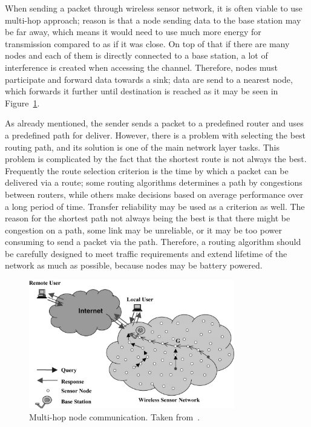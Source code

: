 When sending a packet through wireless sensor network, it is often viable to use multi-hop approach; reason is that a node sending data to the base station may be far away, which means it would need to use much more energy for transmission compared to as if it was close. On top of that if there are many nodes and each of them is directly connected to a base station, a lot of interference is created when accessing the channel. Therefore, nodes must participate and forward data towards a sink; data are send to a nearest node, which forwards it further until destination is reached as it may be seen in Figure~\ref{fig:multihop}.

As already mentioned, the sender sends a packet to a predefined router and uses a predefined path for deliver. However, there is a problem with selecting the best routing path, and its solution is one of the main network layer tasks. This problem is complicated by the fact that the shortest route is not always the best. Frequently the route selection criterion is the time by which a packet can be delivered via a route; some routing algorithms determines a path by congestions between routers, while others make decisions based on average performance over a long period of time. Transfer reliability may be used as a criterion as well. The reason for the shortest path not always being the best is that there might be congestion on a path, some link may be unreliable, or it may be too power consuming to send a packet via the path. Therefore, a routing algorithm should be carefully designed to meet traffic requirements and extend lifetime of the network as much as possible, because nodes may be battery powered.

\begin{figure}
    \centering
    \includegraphics[width=0.8\textwidth]{00images/multihop}
    \caption{Multi-hop node communication. Taken from~\cite{Sohraby2007WirelessApplications}.}
    \label{fig:multihop}
\end{figure}

